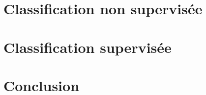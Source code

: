 \section{Classification non supervisée}






\section{Classification supervisée}






\section{Conclusion}


